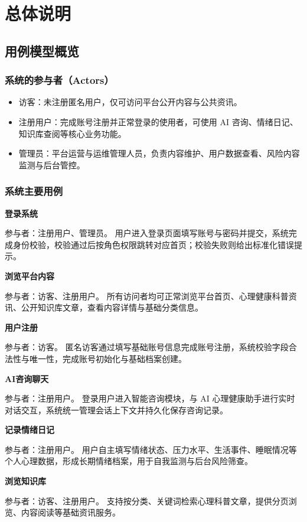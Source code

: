 \section{总体说明}
\subsection{用例模型概览}
\subsubsection{系统的参与者（Actors）}
\begin{itemize}
    \item 访客：未注册匿名用户，仅可访问平台公开内容与公共资讯。
    \item 注册用户：完成账号注册并正常登录的使用者，可使用 AI 咨询、情绪日记、知识库查阅等核心业务功能。
    \item 管理员：平台运营与运维管理人员，负责内容维护、用户数据查看、风险内容监测与后台管控。
\end{itemize}

\subsubsection{系统主要用例}
\textbf{登录系统}

参与者：注册用户、管理员。
用户进入登录页面填写账号与密码并提交，系统完成身份校验，校验通过后按角色权限跳转对应首页；校验失败则给出标准化错误提示。

\textbf{浏览平台内容}

参与者：访客、注册用户。
所有访问者均可正常浏览平台首页、心理健康科普资讯、公开知识库文章，查看内容详情与基础分类信息。

\textbf{用户注册}

参与者：访客。
匿名访客通过填写基础账号信息完成账号注册，系统校验字段合法性与唯一性，完成账号初始化与基础档案创建。

\textbf{AI咨询聊天}

参与者：注册用户。
登录用户进入智能咨询模块，与 AI 心理健康助手进行实时对话交互，系统统一管理会话上下文并持久化保存咨询记录。

\textbf{记录情绪日记}

参与者：注册用户。
用户自主填写情绪状态、压力水平、生活事件、睡眠情况等个人心理数据，形成长期情绪档案，用于自我监测与后台风险筛查。

\textbf{浏览知识库}

参与者：访客、注册用户。
支持按分类、关键词检索心理科普文章，提供分页浏览、内容阅读等基础资讯服务。

